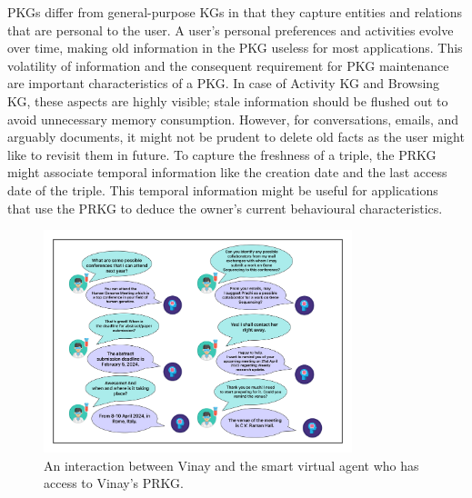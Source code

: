 \documentclass[11pt,pdftex]{article}
\begin{document}
PKGs differ from general-purpose KGs in that they capture entities and relations that are personal to the user. A user's personal preferences and activities evolve over time, making old information in the PKG useless for most applications. This volatility of information and the consequent requirement for PKG maintenance are important characteristics of a PKG. In case of Activity KG and Browsing KG, these aspects are highly visible; stale information should be flushed out to avoid unnecessary memory consumption. However, for conversations, emails, and arguably documents, it might not be prudent to delete old facts as the user might like to revisit them in future. To capture the freshness of a triple, the PRKG might associate temporal information like the creation date and the last access date of the triple. This temporal information might be useful for applications that use the PRKG to deduce the owner's current behavioural characteristics.


\begin{figure}[!htbp]
    \centering
    \includegraphics[width=0.8\textwidth]{submissions/Sudakshina2023/figs/PRKG_Interaction.jpg}
    \caption{An interaction between Vinay and the smart virtual agent who has access to Vinay's PRKG.}
    \label{fig:prkgInteraction}
\end{figure}
\end{document}
